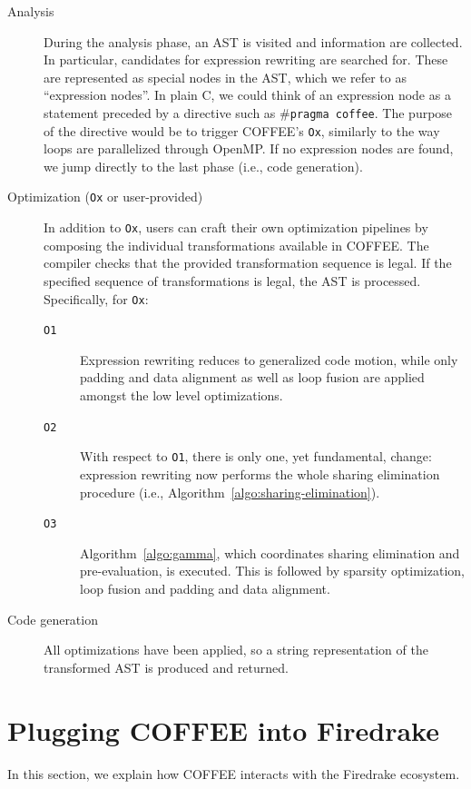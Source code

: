 \begin{description}
\item[Analysis] During the analysis phase, an AST is visited and information are collected. In particular, candidates for expression rewriting are searched for. These are represented as special nodes in the AST, which we refer to as ``expression nodes''. In plain C, we could think of an expression node as a statement preceded by a directive such as \texttt{$\#$pragma coffee}. The purpose of the directive would be to trigger COFFEE's \texttt{Ox}, similarly to the way loops are parallelized through OpenMP. If no expression nodes are found, we jump directly to the last phase (i.e., code generation).

\item[Optimization ({\tt Ox} or user-provided)] In addition to \texttt{Ox}, users can craft their own optimization pipelines by composing the individual transformations available in COFFEE. The compiler checks that the provided transformation sequence is legal. If the specified sequence of transformations is legal, the AST is processed. Specifically, for {\tt Ox}:
\begin{description}
\item[\texttt{O1}] Expression rewriting reduces to generalized code motion, while only padding and data alignment as well as loop fusion are applied amongst the low level optimizations.
\item[\texttt{O2}] With respect to \texttt{O1}, there is only one, yet fundamental, change: expression rewriting now performs the whole sharing elimination procedure (i.e., Algorithm~\ref{algo:sharing-elimination}).
\item[\texttt{O3}] Algorithm~\ref{algo:gamma}, which coordinates sharing elimination and pre-evaluation, is executed. This is followed by sparsity optimization, loop fusion and padding and data alignment.
\end{description}

\item[Code generation]
All optimizations have been applied, so a string representation of the transformed AST is produced and returned.
\end{description}

\section{Plugging COFFEE into Firedrake}
\label{sec:coffee-implementation}

In this section, we explain how COFFEE interacts with the Firedrake ecosystem.


